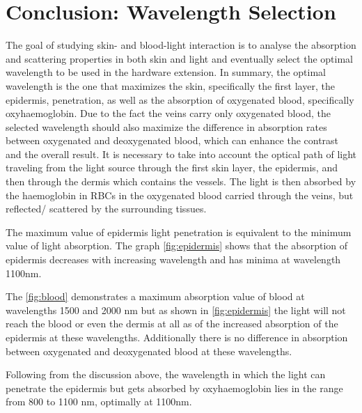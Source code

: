 \section{Conclusion: Wavelength Selection}
The goal of studying skin- and blood-light interaction is to analyse the absorption and scattering properties in both skin and light and eventually select the optimal wavelength to be used in the hardware extension. In summary, the optimal wavelength is the one that maximizes the skin, specifically the first layer, the epidermis, penetration, as well as the absorption of oxygenated blood, specifically oxyhaemoglobin. Due to the fact the veins carry only oxygenated blood, the selected wavelength should also maximize the difference in absorption rates between oxygenated and deoxygenated blood, which can enhance the contrast and the overall result. It is necessary to take into account the optical path of light traveling from the light source through the first skin layer, the epidermis, and then through the dermis which contains the vessels.  The light is then absorbed by the haemoglobin in RBCs in the oxygenated blood carried through the veins, but reflected/ scattered by the surrounding tissues.

The maximum value of epidermis light penetration is equivalent to the minimum value of light absorption. The graph \autoref{fig:epidermis} shows that the absorption of epidermis decreases with increasing wavelength and has minima at wavelength 1100nm.

The \autoref{fig:blood} demonstrates a maximum absorption value of blood at wavelengths 1500 and 2000 nm but as shown in \autoref{fig:epidermis} the light will not reach the blood or even the dermis at all as of the increased absorption of the epidermis at these wavelengths. Additionally there is no difference in absorption between oxygenated and deoxygenated blood at these wavelengths.

Following from the discussion above, the wavelength in which the light can penetrate the epidermis but gets absorbed by oxyhaemoglobin lies in the range from 800 to 1100 nm, optimally at 1100nm.